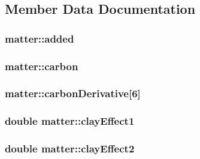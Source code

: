 \subsection{Member Data Documentation}
\hypertarget{classmatter_accdb39d94bfbf28e30c45c063c31c630}{
\subsubsection[{added}]{ {\bf matter::added}}}
\label{classmatter_accdb39d94bfbf28e30c45c063c31c630}
\hypertarget{classmatter_ac47ac49f037d82b8d1cdc16275f341e4}{
\subsubsection[{carbon}]{ {\bf matter::carbon}}}
\label{classmatter_ac47ac49f037d82b8d1cdc16275f341e4}
\hypertarget{classmatter_aee9a37b271a52658a03a7350a173afae}{
\subsubsection[{carbonDerivative}]{ {\bf matter::carbonDerivative}\mbox{[}6\mbox{]}}}
\label{classmatter_aee9a37b271a52658a03a7350a173afae}
\hypertarget{classmatter_a1da4af6772cb60316fe1152209eb2835}{
\subsubsection[{clayEffect1}]{\setlength{\rightskip}{0pt plus 5cm}double {\bf matter::clayEffect1}}}
\label{classmatter_a1da4af6772cb60316fe1152209eb2835}
\hypertarget{classmatter_a79e544386cdb596986c6bf1396a6d79b}{
\subsubsection[{clayEffect2}]{\setlength{\rightskip}{0pt plus 5cm}double {\bf matter::clayEffect2}}}
